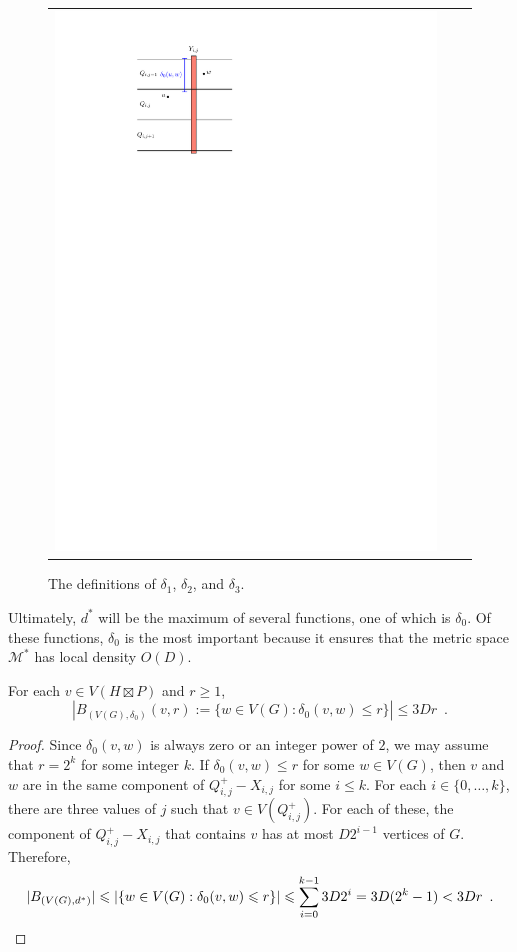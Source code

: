 \documentclass{patmorin}
\renewcommand{\ge}{\geqslant}
\renewcommand{\le}{\leqslant}
\begin{document}
\begin{figure}
\begin{tabular}{ccc}
    \includegraphics[page=3,scale=0.85]{figs/new_metric}
    \end{tabular}
    \caption{The definitions of $\delta_1$, $\delta_2$, and $\delta_3$.}
    \label{d_star}
\end{figure}

Ultimately, $d^*$ will be the maximum of several functions, one of which is $\delta_0$.  Of these functions, $\delta_0$ is the most important because it ensures that the metric space $\mathcal{M}^*$ has local density $O(D)$.

\begin{lem}\label{delta_density}
  For each $v\in V(H\boxtimes P)$ and $r\ge 1$,
  \[
    |B_{(V(G),\delta_0)}(v,r):=\{w\in V(G):\delta_0(v,w)\le r\}| \le 3Dr \enspace .
  \]
\end{lem}

\begin{proof}
  Since $\delta_0(v,w)$ is always zero or an integer power of $2$, we may assume that $r=2^k$ for some integer $k$.  If $\delta_0(v,w)\le r$ for some $w\in V(G)$, then $v$ and $w$ are in the same component of $Q^+_{i,j}-X_{i,j}$ for some $i \le k$.  For each $i\in\{0,\ldots,k\}$, there are three values of $j$ such that $v\in V(Q^+_{i,j})$.  For each of these, the component of $Q^+_{i,j}-X_{i,j}$ that contains $v$ has at most $D2^{i-1}$ vertices of $G$. Therefore,
  \[
    |B_{(V(G),d^*)}| \le |\{w\in V(G): \delta_0(v,w)\le r\}| \le \sum_{i=0}^{k-1} 3D2^{i} = 3D(2^{k}-1) < 3Dr \enspace . \qedhere
  \]
\end{proof}
\end{document}
